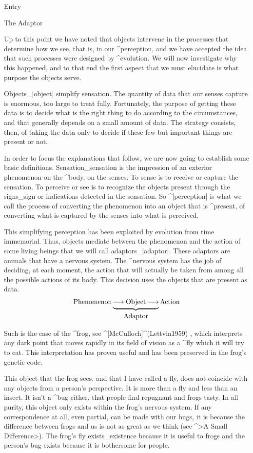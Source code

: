 
\Part Entry

\Section The Adaptor

Up to this point we have noted that objects intervene in the processes
that determine how we see, that is, in our ^{perception}, and we have
accepted the idea that such processes were designed by ^{evolution}. We
will now investigate why this happened, and to that end the first aspect
that we must elucidate is what purpose the objects serve.

Objects_|object| simplify sensation. The quantity of data that our
senses capture is enormous, too large to treat fully. Fortunately, the
purpose of getting these data is to decide what is the right thing to do
according to the circumstances, and that generally depends on a small
amount of data. The strategy consists, then, of taking the data only to
decide if these few but important things are present or not.

In order to focus the explanations that follow, we are now going to
establish some basic definitions. Sensation_{sensation} is the
impression of an exterior phenomenon on the ^{body}, on the senses. To
sense is to receive or capture the sensation. To perceive or see is to
recognize the objects present through the signs_{sign} or indications
detected in the sensation. So ^|perception| is what we call the process
of converting the phenomenon into an object that is ^{present}, of
converting what is captured by the senses into what is perceived.

This simplifying perception has been exploited by evolution from time
immemorial. Thus, objects mediate between the phenomenon and the action
of some living beings that we will call adaptors_|adaptor|. These
adaptors are animals that have a nervous system. The ^{nervous system}
has the job of deciding, at each moment, the action that will actually
be taken from among all the possible actions of its body. This decision
uses the objects that are present as data.
$$\hbox{Phenomenon}
  \underbrace{
   \longrightarrow
   \hbox{\strut Object}
   \longrightarrow}_{\hbox{\strut Adaptor}}
  \hbox{Action}
$$

Such is the case of the ^{frog}, see ^[McCulloch]^(Lettvin1959)
, which interprets any dark point that moves rapidly in
its field of vision as a ^{fly} which it will try to eat. This
interpretation has proven useful and has been preserved in the frog's
genetic code.

This object that the frog sees, and that I have called a fly, does not
coincide with any objects from a person's perspective. It is more than a
fly and less than an insect. It isn't a ^{bug} either, that people find
repugnant and frogs tasty. In all purity, this object only exists within
the frog's nervous system. If any correspondence at all, even partial,
can be made with our bugs, it is because the difference between frogs
and us is not as great as we think (see ^>A Small Difference>). The
frog's fly exists_{existence} because it is useful to frogs and the
person's bug exists because it is bothersome for people.

